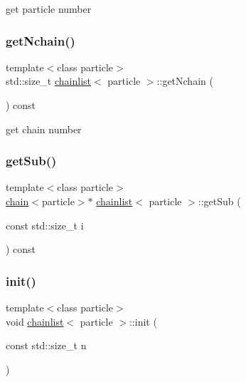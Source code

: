 get particle number 

\hypertarget{classchainlist_aeba7adee0d0820d63fd0bb933f4abd57}{}\label{classchainlist_aeba7adee0d0820d63fd0bb933f4abd57} 
\subsubsection{\texorpdfstring{get\+Nchain()}{getNchain()}}
{\footnotesize\ttfamily template$<$class particle$>$ \\
std\+::size\+\_\+t \hyperlink{classchainlist}{chainlist}$<$ particle $>$\+::get\+Nchain (\begin{DoxyParamCaption}{ }\end{DoxyParamCaption}) const\hspace{0.3cm}{\ttfamily [inline]}}



get chain number 

\hypertarget{classchainlist_a7c4566c5074a6c1f34b2a5ca3166ce99}{}\label{classchainlist_a7c4566c5074a6c1f34b2a5ca3166ce99} 
\subsubsection{\texorpdfstring{get\+Sub()}{getSub()}}
{\footnotesize\ttfamily template$<$class particle$>$ \\
\hyperlink{classchain}{chain}$<$particle$>$$\ast$ \hyperlink{classchainlist}{chainlist}$<$ particle $>$\+::get\+Sub (\begin{DoxyParamCaption}\item[{const std\+::size\+\_\+t}]{i }\end{DoxyParamCaption}) const\hspace{0.3cm}{\ttfamily [inline]}}

\hypertarget{classchainlist_a5890d32b99e977a9b64e10a1df140353}{}\label{classchainlist_a5890d32b99e977a9b64e10a1df140353} 
\subsubsection{\texorpdfstring{init()}{init()}}
{\footnotesize\ttfamily template$<$class particle$>$ \\
void \hyperlink{classchainlist}{chainlist}$<$ particle $>$\+::init (\begin{DoxyParamCaption}\item[{const std\+::size\+\_\+t}]{n }\end{DoxyParamCaption})\hspace{0.3cm}{\ttfamily [inline]}}

